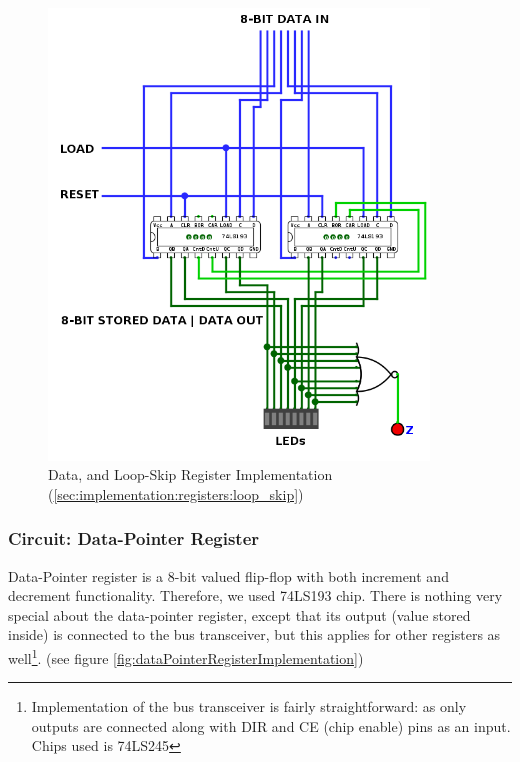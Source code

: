\begin{figure}[H]
	\centering
	\includegraphics[width=0.9\textwidth]{img/data_register_implementation}
	\caption{Data, and Loop-Skip Register Implementation (\ref{sec:implementation:registers:loop_skip})}
	\label{fig:dataRegisterImplementation}
\end{figure}


\subsubsection{Circuit: Data-Pointer Register}
Data-Pointer register is a 8-bit valued flip-flop with both increment and decrement functionality. Therefore, we used 74LS193 chip. There is nothing very special about the data-pointer register, except that its output (value stored inside) is connected to the bus transceiver, but this applies for other registers as well\footnote{Implementation of the bus transceiver is fairly straightforward: as only outputs are connected along with DIR and CE (chip enable) pins as an input. Chips used is 74LS245}. (see figure \ref{fig:dataPointerRegisterImplementation})

